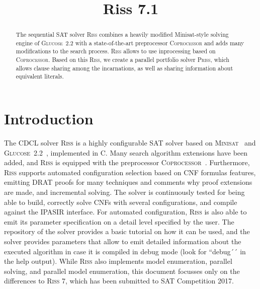 \documentclass[conference]{IEEEtran}
\def\CC{{C\nolinebreak[4]\hspace{-.05em}\raisebox{.4ex}{\tiny\bf ++}}}
\begin{document}
	
\title{Riss 7.1}

\author{
}

\maketitle

\def\coprocessor{\textsc{Coprocessor}\xspace}
\def\glucose{\textsc{Glucose~2.2}\xspace}
\def\minisat{\textsc{Minisat~2.2}\xspace}
\def\riss{\textsc{Riss}\xspace}
\def\priss{\textsc{Priss}\xspace}

\begin{abstract}
The sequential SAT solver \riss combines a heavily modified Minisat-style solving engine of \glucose with a state-of-the-art preprocessor \textsc{Coprocessor} and adds many modifications to the search process. 
\riss allows to use inprocessing based on \coprocessor.
Based on this \riss, we create a parallel portfolio solver \priss, which allows clause sharing among the incarnations, as well as sharing information about equivalent literals. 
\end{abstract}

\section{Introduction}

The CDCL solver \riss is a highly configurable SAT solver based on \textsc{Minisat}~\cite{EenS:2003} and \glucose ~\cite{AudemardS:2009,Audemard:2012:RRS:2405292.2405308}, implemented in \CC. 
Many search algorithm extensions have been added, and \riss is equipped with the preprocessor \textsc{Coprocessor}~\cite{Manthey:2012}. 
Furthermore, \riss supports automated configuration selection based on CNF formulas features, emitting DRAT proofs for many techniques and comments why proof extensions are made, and incremental solving.
The solver is continuously tested for being able to build, correctly solve CNFs with several configurations, and compile against the IPASIR interface.
For automated configuration, \riss is also able to emit its parameter specification on a detail level specified by the user.
The repository of the solver provides a basic tutorial on how it can be used, and the solver provides parameters that allow to emit detailed information about the executed algorithm in case it is compiled in debug mode (look for ``debug´´ in the help output).
While \riss also implements model enumeration, parallel solving, and parallel model enumeration, this document focusses only on the differences to \textsc{Riss 7}, which has been submitted to SAT Competition 2017. 
\end{document}
